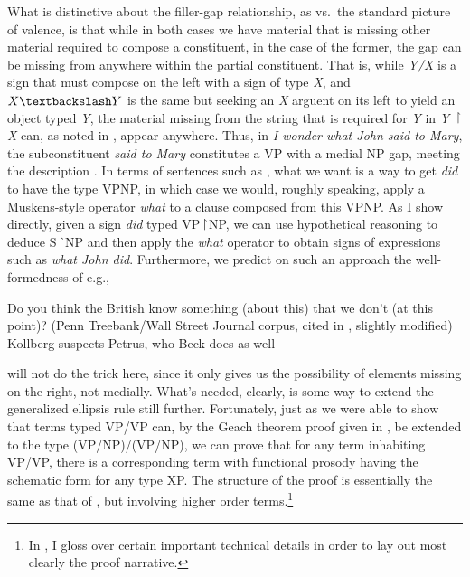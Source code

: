 \documentclass[output=paper,colorlinks,citecolor=brown]{langscibook}
\begin{document}
What is distinctive about the filler-gap relationship, as vs.\  the
standard picture of valence, is that while in both cases we have material
that is missing other material required to compose a constituent, in
the case of the former, the gap can be missing from anywhere within
the partial constituent. That is, while \textit{Y/X} is a sign that must
compose on the left with a sign of type \textit{X}, and $X\bsl Y$ is the same
but seeking an \textit{X} arguent on its left to yield an object typed \textit{Y},
the material missing from the string that is required for \textit{Y} in
\textit{Y} \ensuremath{\vs}\textit{X} can, as noted in , appear
anywhere. Thus, in \textit{I wonder what John said to Mary}, the
subconstituent \textit{said {\gp}\xspace to Mary} constitutes a VP with a medial NP
gap, meeting the description . In terms of sentences such as
, what we want is a way to get \textit{did} to have the type
VP\vs NP, in which case we would, roughly speaking, apply a Muskens-style
operator \textit{what} to a clause composed from this VP\vs NP. As I show
directly, given a sign \textit{did} typed VP\ensuremath{\vs}NP, we can use hypothetical
reasoning to deduce S\ensuremath{\vs}NP and then apply the \textit{what} operator to obtain
signs of expressions such as \textit{what John did}. Furthermore, we predict
on such an approach the well-formedness of e.g.,

\begin{exe}
 \ex\label{internal}
  \begin{xlist}
 \ex\label{}
    Do you think the British know something (about this) that we don't
(at this point)? (Penn Treebank/Wall Street Journal corpus, cited in
\citet{bos-spenader2011}, slightly modified)
 \ex\label{}
    Kollberg suspects Petrus, who Beck does {\gp}\xspace as well \citep[666]{kennedy1995}
  \end{xlist}
\end{exe}
 will not do the trick here, since it only gives us
the possibility of elements missing on the right, not medially. What's
needed, clearly, is some way to extend the generalized ellipsis rule
still further. Fortunately, just as we were able to show that terms
typed VP/VP can, by the Geach theorem proof given in , be
extended to the type (VP/NP)/(VP/NP), we can prove that for any term
inhabiting VP/VP, there is a corresponding term with functional
prosody having the schematic form  for any type XP.
The structure of the proof is essentially the same as that of
, but involving higher order terms.\footnote{In
, I gloss over certain important technical details in
order to lay out most clearly the proof narrative.}
\end{document}
